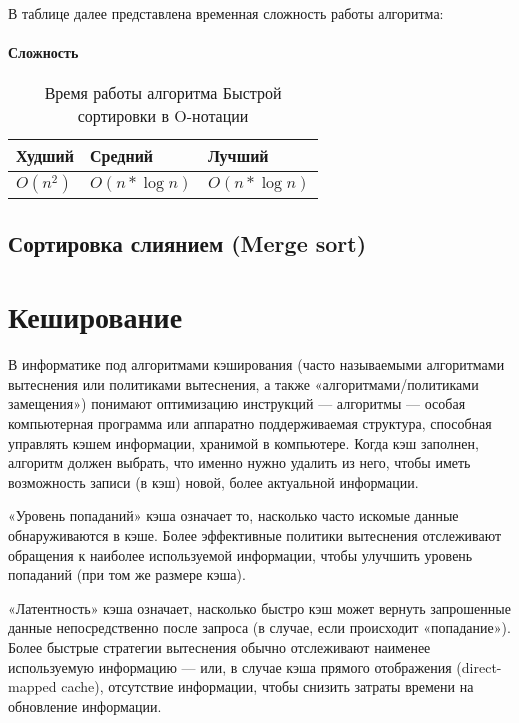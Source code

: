 В таблице далее представлена временная сложность работы алгоритма:

		\subsubsection{Сложность}
\begin{table}[h!]
\caption{Время работы алгоритма Быстрой сортировки в O-нотации}
\begin{tabular}{|l|l|l|}
\hline
Худший & Средний & Лучший \\ \hline
$ O(n^{2}) $ & $ O(n*\log n) $ & $ O(n*\log n) $ \\\hline
\end{tabular}
\end{table}

\section{Сортировка слиянием (Merge sort)}

\linenumbers
{}
\nolinenumbers

\chapter{Кеширование}

В информатике под алгоритмами кэширования (часто называемыми алгоритмами вытеснения или политиками вытеснения, а также «алгоритмами/политиками замещения») понимают оптимизацию инструкций — алгоритмы — особая компьютерная программа или аппаратно поддерживаемая структура, способная управлять кэшем информации, хранимой в компьютере. Когда кэш заполнен, алгоритм должен выбрать, что именно нужно удалить из него, чтобы иметь возможность записи (в кэш) новой, более актуальной информации.

«Уровень попаданий» кэша означает то, насколько часто искомые данные обнаруживаются в кэше. Более эффективные политики вытеснения отслеживают обращения к наиболее используемой информации, чтобы улучшить уровень попаданий (при том же размере кэша).

«Латентность» кэша означает, насколько быстро кэш может вернуть запрошенные данные непосредственно после запроса (в случае, если происходит «попадание»). Более быстрые стратегии вытеснения обычно отслеживают наименее используемую информацию — или, в случае кэша прямого отображения (direct-mapped cache), отсутствие информации, чтобы снизить затраты времени на обновление информации.

